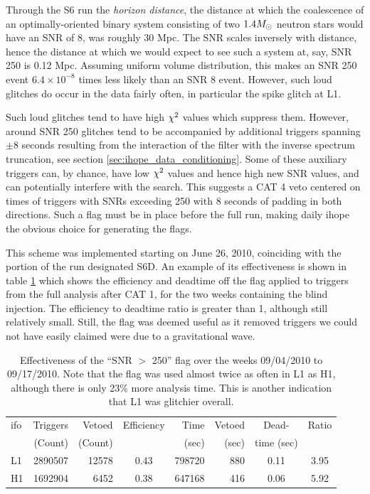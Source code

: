 
Through the S6 run the \emph{horizon distance}, the distance at which
the coalescence of an optimally-oriented binary system consisting of
two $1.4 M_\odot$ neutron stars would have an SNR of 8, was roughly 30
Mpc.  The SNR scales inversely with distance, hence the distance at
which we would expect to see such a system at, say, SNR 250 is 0.12
Mpc.  Assuming uniform volume distribution, this makes an SNR 250
event $6.4 \times 10^{-8}$ times less likely than an SNR 8 event.  
However, such loud glitches do occur in the data fairly often,
in particular the spike glitch at L1.

Such loud glitches tend to have high $\chi^2$ values which suppress
them.  However, around SNR 250 glitches tend to be accompanied by
additional triggers spanning $\pm 8$ seconds resulting from the
interaction of the filter with the inverse spectrum truncation, see
section \ref{sec:ihope_data_conditioning}.  Some of these auxiliary
triggers can, by chance, have low $\chi^2$ values and hence high new
SNR values, and can potentially interfere with the search.  This
suggests a CAT 4 veto centered on times of triggers with SNRs
exceeding 250 with 8 seconds of padding in both directions.  Such a
flag must be in place before the full run, making daily ihope the
obvious choice for generating the flags.

This scheme was implemented starting on June 26, 2010, coinciding with
the portion of the run designated S6D.  An example of its
effectiveness is shown in table \ref{tab:daily_ihope_loud_flag} which
shows the efficiency and deadtime off the flag applied to triggers
from the full analysis after CAT 1, for the two weeks containing the
blind injection.  The efficiency to deadtime ratio is greater than 1,
although still relatively small.  Still, the flag was deemed useful as
it removed triggers we could not have easily claimed were due to a
gravitational wave.

\begin{table}
\begin{center}
\begin{tabular}{lrrcrrcc}
\hline
ifo & Triggers & Vetoed & Efficiency & Time
& Vetoed & Dead-  & Ratio \\
 & (Count) & (Count) &  & (sec) & (sec) & time (sec) &  \\
\hline
L1  & 2890507 & 12578 & 0.43 & 798720 & 880 & 0.11 & 3.95 \\
H1  & 1692904 &  6452 & 0.38 & 647168 & 416 & 0.06 & 5.92 \\
\end{tabular}
  \caption[Effectiveness of the ``SNR $>$ 250'' flag]{
  \label{tab:daily_ihope_loud_flag}
Effectiveness of the ``SNR $>$ 250'' flag over the weeks
09/04/2010  to 09/17/2010.  Note that the flag was used almost twice
as often in L1 as H1, although there is only 23\% more analysis time.
This is another indication that L1 was glitchier overall.}
\end{center}
\end{table}



